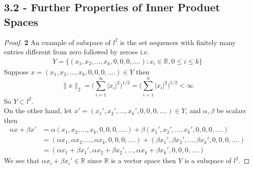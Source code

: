 \documentclass[11pt]{article}
\newcommand{\R}{\mathbb{R}}
\theoremstyle{definition}
\begin{document}
\subsection*{3.2 - Further Properties of Inner Produet Spaces}
\begin{proof}{\textbf{2}}
An example of subspace of $l^2$ is the set sequences with finitely many entries
different from zero followed by zeroes i.e.
\begin{align*}
    Y = \{(x_1, x_2, ..., x_k, 0, 0, 0, ....): x_i \in \R, 0 \leq i \leq k\}
\end{align*}
Suppose $x = (x_1, x_2, ..., x_k, 0, 0, 0, ....) \in Y$ then 
$$\|x\|_2 = \bigg(\sum_{i=1}^\infty |x_i|^2\bigg)^{1/2}
= \bigg(\sum_{i=1}^k |x_i|^2\bigg)^{1/2} < \infty$$
So $Y \subset l^2$.\\
On the other hand, let $x' = (x_1', x_2', ..., x_k', 0, 0, 0, ....) \in Y$,
and $\alpha, \beta$ be scalars then 
\begin{align*}
    \alpha x + \beta x'
    &= \alpha (x_1, x_2, ..., x_k, 0, 0, 0, ....)
    + \beta (x_1', x_2', ..., x_k', 0, 0, 0, ....)\\
    &=(\alpha x_1, \alpha x_2, ..., \alpha x_k, 0, 0, 0, ....)
    + (\beta x_1', \beta x_2', ..., \beta x_k', 0, 0, 0, ....)\\
    &=(\alpha x_1 + \beta x_1', \alpha x_2 + \beta x_2', ...,
    \alpha x_k + \beta x_k', 0, 0, 0, ....)
\end{align*}
We see that $\alpha x_i + \beta x_i' \in \R$ since $\R$ is a vector space then
$Y$ is a subspace of $l^2$.
\end{proof}
\end{document}
